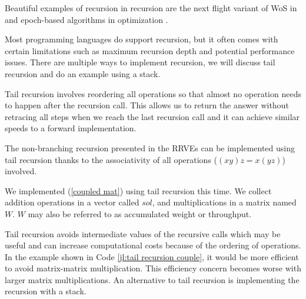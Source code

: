 \documentclass[a4paper,12pt]{article}
\begin{document}
\begin{related}
    Beautiful examples of recursion in recursion are
    the next flight variant of WoS in
    \cite{sawhney_grid-free_2022} and epoch-based algorithms in optimization
    \cite{gupta_convergence_2021}.
\end{related}

Most programming languages do support recursion, but it often comes with certain
limitations such as maximum recursion depth and potential performance issues.
There are multiple ways to implement recursion, we will discuss tail recursion and
do an example using a stack.

\begin{technique}
    Tail recursion involves reordering all operations
    so that almost no operation needs to happen after
    the recursion call. This allows us to return the
    answer without retracing all steps when we reach
    the last recursion call and it can achieve similar
    speeds to a forward implementation.
\end{technique}

The non-branching recursion presented in the RRVEs can
be implemented using tail recursion thanks to the associativity
of all operations ($(xy)z = x(yz)$) involved.


\begin{julia} \label{jl:tail recursion couple}
    We implemented (\ref{coupled mat}) using tail recursion this time. We
    collect addition operations in a vector called $sol$, and multiplications
    in a matrix named $W$. $W$ may also be referred to as accumulated weight
    or throughput.
    \vspace{0.3cm}
\end{julia}

Tail recursion avoids intermediate values
of the recursive calls which may be useful and
can increase computational costs because of the ordering of operations.
In the example shown in Code \ref{jl:tail recursion couple}, it would be more efficient
to avoid matrix-matrix multiplication. This efficiency concern becomes
worse with larger matrix multiplications. An alternative to tail recursion is implementing
the recursion with a stack.
\end{document}
